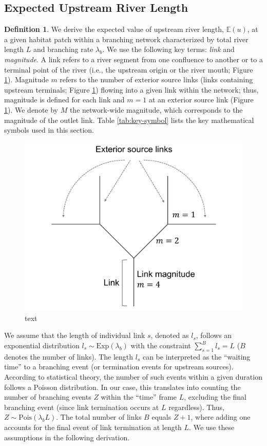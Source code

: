 \documentclass[11pt, class=article, crop=false]{standalone}
\theoremstyle{definition}
\newtheorem{definition}{Definition}[subsection]
\begin{document}
\newpage

\subsection{Expected Upstream River Length} \label{updist}

\begin{definition}
We derive the expected value of upstream river length, $\mathbb{E}(u)$, at a given habitat patch within a branching network characterized by total river length $L$ and branching rate $\lambda_b$.
We use the following key terms: \textit{link} and \textit{magnitude}.
A link refers to a river segment from one confluence to another or to a terminal point of the river (i.e., the upstream origin or the river mouth; Figure \ref{fig:river-fig}).
Magnitude $m$ refers to the number of exterior source links (links containing upstream terminals; Figure \ref{fig:river-fig}) flowing into a given link within the network; thus, magnitude is defined for each link and $m=1$ at an exterior source link (Figure \ref{fig:river-fig}).
We denote by $M$ the network-wide magnitude, which corresponds to the magnitude of the outlet link.
Table \ref{tab:key-symbol} lists the key mathematical symbols used in this section.

\begin{figure}
    \includegraphics[width=0.5\linewidth]{output/fig_si_mag.pdf}
    \caption{text}
    \label{fig:river-fig}
\end{figure}

We assume that the length of individual link $s$, denoted as $l_s$, follows an exponential distribution $l_s \sim \mbox{Exp}(\lambda_b)$ with the constraint $\sum_{s = 1}^{B} l_s = L$ ($B$ denotes the number of links).
The length $l_s$ can be interpreted as the ``waiting time'' to a branching event (or termination events for upstream sources).
According to statistical theory, the number of such events within a given duration follows a Poisson distribution.
In our case, this translates into counting the number of branching events $Z$ within the ``time'' frame $L$, excluding the final branching event (since link termination occurs at $L$ regardless).
Thus, $Z \sim \mbox{Pois}(\lambda_b L)$.
The total number of links $B$ equals $Z + 1$, where adding one accounts for the final event of link termination at length $L$.
We use these assumptions in the following derivation.


\end{definition}
\end{document}
